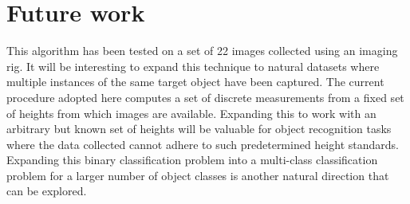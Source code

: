\documentclass {udthesis}
\begin{document}
\section{Future work}

This algorithm has been tested on a set of 22 images collected using an imaging rig. It will be interesting to expand this technique to natural datasets where multiple instances of the same target object have been captured. The current procedure adopted here computes a set of discrete measurements from a fixed set of heights from which images are available. Expanding this to work with an arbitrary but known set of heights will be valuable for object recognition tasks where the data collected cannot adhere to such predetermined height standards. Expanding this binary classification problem into a multi-class classification problem for a larger number of object classes is another natural direction that can be explored.


\printglossary[type=\acronymtype]                  
\end{document}

